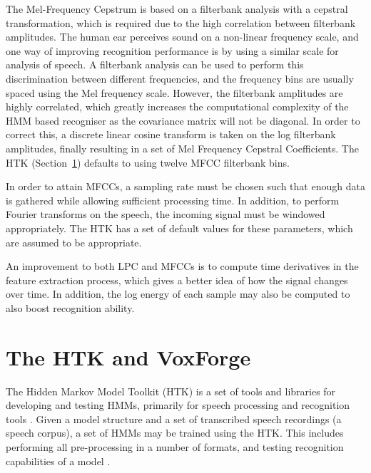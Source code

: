	The Mel-Frequency Cepstrum is based on a filterbank analysis with a cepstral transformation, which is required due to the high correlation between filterbank amplitudes.  The human ear perceives sound on a non-linear frequency scale, and one way of improving recognition performance is by using a similar scale for analysis of speech.  A filterbank analysis can be used to perform this discrimination between different frequencies, and the frequency bins are usually spaced using the Mel frequency scale.  However, the filterbank amplitudes are highly correlated, which greatly increases the computational complexity of the HMM based recogniser as the covariance matrix will not be diagonal.  In order to correct this, a discrete linear cosine transform is taken on the log filterbank amplitudes, finally resulting in a set of Mel Frequency Cepstral Coefficients.  The HTK (Section~\ref{sec:the_htk}) defaults to using twelve MFCC filterbank bins. \cite{htkbook} \cite{melnikoff2003speech}

	In order to attain MFCCs, a sampling rate must be chosen such that enough data is gathered while allowing sufficient processing time.  In addition, to perform Fourier transforms on the speech, the incoming signal must be windowed appropriately.  The HTK has a set of default values for these parameters, which are assumed to be appropriate.

	An improvement to both LPC and MFCCs is to compute time derivatives in the feature extraction process, which gives a better idea of how the signal changes over time.  In addition, the log energy of each sample may also be computed to also boost recognition ability.


\section{The HTK and VoxForge} %
\label{sec:the_htk}
	The Hidden Markov Model Toolkit (HTK) is a set of tools and libraries for developing and testing HMMs, primarily for speech processing and recognition tools \cite{htkbook}.  Given a model structure and a set of transcribed speech recordings (a speech corpus), a set of HMMs may be trained using the HTK.  This includes performing all pre-processing in a number of formats, and testing recognition capabilities of a model \cite{woodland1994htk}.

